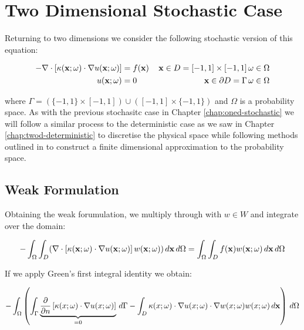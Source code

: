 \chapter{Two Dimensional Stochastic Case}\label{chap:twod-stochastic}

Returning to two dimensions we consider the following stochastic version of
this equation:

\begin{equation}\label{eq:twod-stochastic}
  \begin{aligned}
      -\nabla\cdot\left[\kappa(\mathbf{x};\omega)\cdot\nabla u(\mathbf{x};\omega) \right]
      &= f(\mathbf{x})\, &\mathbf{x} \in D = [-1,1] \times [-1,1]\, \omega \in \Omega \\
      u(\mathbf{x};\omega) &= 0\, &\mathbf{x} \in \partial D = \Gamma\, \omega \in \Omega
  \end{aligned}
\end{equation}

where $\Gamma = (\{-1,1\} \times [-1,1]) \cup ([-1,1] \times \{-1, 1\})$ and
$\Omega$ is a probability space. As with the previous stochasitc case in
Chapter \ref{chap:oned-stochastic} we will follow a similar process to the
deterministic case as we saw in Chapter \ref{chap:twod-deterministic} to
discretise the physical space while following methods outlined in
\cite{general-poly-chaos} to construct a finite dimensional approximation to
the probability space.

\section{Weak Formulation}


Obtaining the weak forumulation, we multiply through with $w \in W$ and
integrate over the domain:

\begin{equation}
    -\int_{\Omega}\int_D(\nabla\cdot\left[
        \kappa(\mathbf{x};\omega)\cdot\nabla u(\mathbf{x};\omega)\right]
    w(\mathbf{x};\omega))\, d\mathbf{x}\, d\Omega =
        \int_{\Omega}\int_Df(\mathbf{x})w(\mathbf{x};\omega)\, d\mathbf{x}\, d\Omega
\end{equation}

If we apply Green's first integral identity we obtain:

\begin{equation}
    -\int_{\Omega}\left(\int_{\Gamma}\underbrace{\frac{\partial}{\partial n}
        \left[\kappa(x;\omega)\cdot\nabla u(x;\omega)\right]}_{=0}\, d\Gamma
      -\int_D \kappa(x;\omega)\cdot\nabla u(x;\omega)\cdot\nabla w(x;\omega)
      w(x;\omega)\, d\mathbf{x}
  \right)\, d\Omega
\end{equation}

